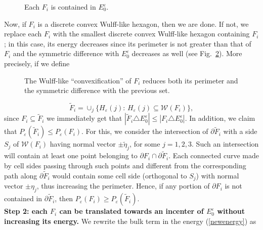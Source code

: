 \documentclass{interact}
\numberwithin{equation}{section}
\theoremstyle{definition}
\renewcommand{\epsilon}{\varepsilon}
\begin{document}
\begin{figure}[ht]
\centering
\def\svgwidth{150pt}
\hfil
\def\svgwidth{150pt}

\caption{Each $F_i$ is contained in $E^\epsilon_0$.}\label{contain}
\end{figure}


Now, if $F_i$ is a discrete convex Wulff-like hexagon, then we are done. If not, we replace each $F_i$ with the smallest discrete convex Wulff-like hexagon containing $F_i$; in this case, its energy decreases since its perimeter is not greater than that of $F_i$ and the symmetric difference with $E^\epsilon_0$ decreases as well (see Fig.~\ref{convex}). More precisely, if we define

\begin{figure}[ht]
\centering
\def\svgwidth{180pt}
\hfil
\def\svgwidth{180pt}

\caption{The Wulff-like ``convexification'' of $F_i$ reduces both its perimeter and the symmetric difference with the previous set.}\label{convex}
\end{figure}

\begin{equation*}
\widetilde{F}_i=\cup_j\{H_\epsilon(j):\,H_\epsilon(j)\subseteq\mathcal{W}(F_i)\},
\end{equation*}
since $F_i\subseteq\widetilde{F}_i$ we immediately get that $|\widetilde{F}_i\triangle E^\epsilon_0|\leq|{F}_i\triangle E^\epsilon_0|$. In addition, we claim that $P_\epsilon(\widetilde{F}_i)\leq P_\epsilon({F}_i)$. For this, we consider the intersection of $\partial \widetilde{F}_i$ with a side $S_j$ of $\mathcal{W}(F_i)$ having normal vector $\pm\widetilde{\eta}_j$, for some $j=1,2,3$. Such an intersection will contain at least one point belonging to $\partial F_i\cap\partial \widetilde{F}_i$. Each connected curve made by cell sides passing through such points and different from the corresponding path along $\partial\widetilde{F}_i$ would contain some cell side (orthogonal to $S_j$) with normal vector $\pm \eta_j$, thus increasing the perimeter. Hence, if any portion of $\partial F_i$ is not contained in $\partial \widetilde{F}_i$, then $P_\epsilon({F}_i)\geq P_\epsilon(\widetilde{F}_i)$.
\\
\noindent
{\bf Step 2: each $F_i$ can be translated towards an incenter of $E^\epsilon_0$ without increasing its energy.} We rewrite the bulk term in the energy (\ref{newenergy}) as
\end{document}
